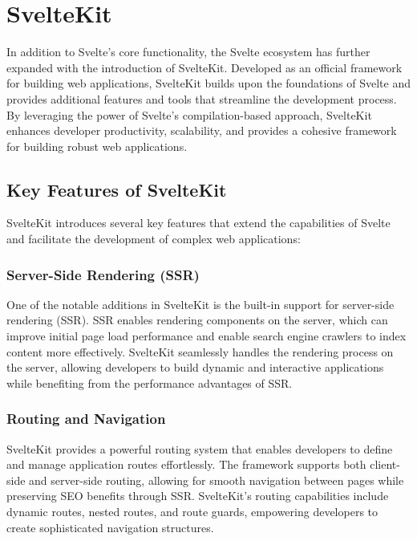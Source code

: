 \section{SvelteKit}

In addition to Svelte's core functionality, the Svelte ecosystem has further expanded with the introduction of SvelteKit. Developed as an official framework for building web applications, SvelteKit builds upon the foundations of Svelte and provides additional features and tools that streamline the development process. By leveraging the power of Svelte's compilation-based approach, SvelteKit enhances developer productivity, scalability, and provides a cohesive framework for building robust web applications.

\subsection{Key Features of SvelteKit}

SvelteKit introduces several key features that extend the capabilities of Svelte and facilitate the development of complex web applications:

\subsubsection{Server-Side Rendering (SSR)}

One of the notable additions in SvelteKit is the built-in support for server-side rendering (SSR). SSR enables rendering components on the server, which can improve initial page load performance and enable search engine crawlers to index content more effectively. SvelteKit seamlessly handles the rendering process on the server, allowing developers to build dynamic and interactive applications while benefiting from the performance advantages of SSR.

\subsubsection{Routing and Navigation}

SvelteKit provides a powerful routing system that enables developers to define and manage application routes effortlessly. The framework supports both client-side and server-side routing, allowing for smooth navigation between pages while preserving SEO benefits through SSR. SvelteKit's routing capabilities include dynamic routes, nested routes, and route guards, empowering developers to create sophisticated navigation structures.

